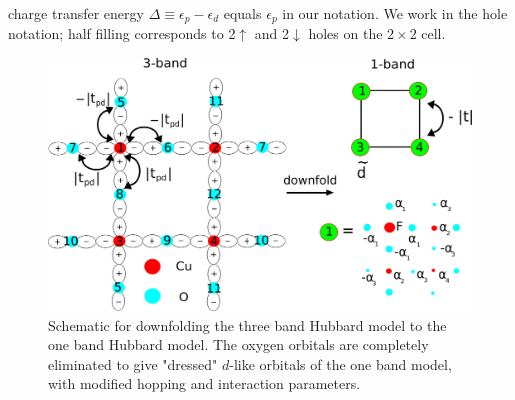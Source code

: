 charge transfer energy $\Delta \equiv \epsilon_p - \epsilon_d$ equals $\epsilon_p$ in our notation. 
We work in the hole notation; half filling corresponds to 2$\uparrow$ and 2$\downarrow$ holes on the $2\times2$ cell.
\begin{figure}[htpb]
\centering
\includegraphics[width=0.8\linewidth]{./Figures/three_band_figure.eps}
\caption{Schematic for downfolding the three band Hubbard model to the one band Hubbard model. 
The oxygen orbitals are completely eliminated to give "dressed" $d$-like orbitals of the one band model, with modified hopping 
and interaction parameters.}
\label{fig:threeband} 
\end{figure}	

